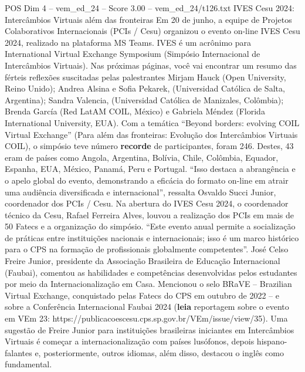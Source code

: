\begin{textsample}{POS Dim 4 – vem\_ed\_24 – Score 3.00 – vem\_ed\_24/t126.txt}  \label{ex:f4_pos_105}
IVES Cesu 2024: Intercâmbios Virtuais além das fronteiras Em 20 de junho, a equipe de Projetos Colaborativos Internacionais (PCIs / Cesu) organizou o evento on-line IVES Cesu 2024, realizado na plataforma MS Teams.
IVES é um acrônimo para International Virtual Exchange Symposium (Simpósio Internacional de Intercâmbios Virtuais).
Nas próximas páginas, você vai encontrar um resumo das férteis reflexões suscitadas pelas palestrantes Mirjam Hauck (Open University, Reino Unido); Andrea Alsina e Sofia Pekarek, (Universidad Católica de Salta, Argentina); Sandra Valencia, (Universidad Católica de Manizales, Colômbia); Brenda García (Red LatAM COIL, México) e Gabriela Méndez (Florida International University, EUA).
Com a temática “Beyond borders: evolving COIL Virtual Exchange” (Para além das fronteiras: Evolução dos Intercâmbios Virtuais COIL), o simpósio teve número \textbf{recorde} de participantes, foram 246.
Destes, 43 eram de países como Angola, Argentina, Bolívia, Chile, Colômbia, Equador, Espanha, EUA, México, Panamá, Peru e Portugal. “Isso destaca a abrangência e o apelo global do evento, demonstrando a eficácia do formato on-line em atrair uma audiência diversificada e internacional”, ressalta Osvaldo Succi Junior, coordenador dos PCIs / Cesu.
Na abertura do IVES Cesu 2024, o coordenador técnico da Cesu, Rafael Ferreira Alves, louvou a realização dos PCIs em mais de 50 Fatecs e a organização do simpósio. “Este evento anual permite a socialização de práticas entre instituições nacionais e internacionais; isso é um marco histórico para o CPS na formação de profissionais globalmente competentes”.
José Celso Freire Junior, presidente da Associação Brasileira de Educação Internacional (Faubai), comentou as habilidades e competências desenvolvidas pelos estudantes por meio da Internacionalização em Casa.
Mencionou o selo BRaVE – Brazilian Virtual Exchange, conquistado pelas Fatecs do CPS em outubro de 2022 – e sobre a Conferência Internacional Faubai 2024 (\textbf{leia} reportagem sobre o evento em VEm 23: https://publicacoescesu.cps.sp.gov.br/VEm/issue/view/35).
Uma sugestão de Freire Junior para instituições brasileiras iniciantes em Intercâmbios Virtuais é começar a internacionalização com países lusófonos, depois hispano-falantes e, posteriormente, outros idiomas, além disso, destacou o inglês como fundamental.

\end{textsample}
